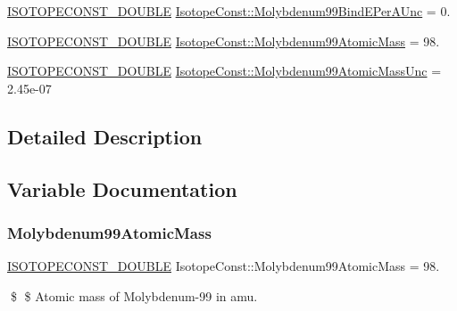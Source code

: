 \begin{DoxyCompactItemize}
\mbox{\hyperlink{group___isotope_const-_macros_ga8f45a7272ce02c0b4c65c44636ed719a}{I\+S\+O\+T\+O\+P\+E\+C\+O\+N\+S\+T\+\_\+\+D\+O\+U\+B\+LE}} \mbox{\hyperlink{group___isotope_const-_molybdenum-_mo99_ga4831990ba352bfbcdbaa43ddada32390}{Isotope\+Const\+::\+Molybdenum99\+Bind\+E\+Per\+A\+Unc}} = 0.
\item 
\mbox{\hyperlink{group___isotope_const-_macros_ga8f45a7272ce02c0b4c65c44636ed719a}{I\+S\+O\+T\+O\+P\+E\+C\+O\+N\+S\+T\+\_\+\+D\+O\+U\+B\+LE}} \mbox{\hyperlink{group___isotope_const-_molybdenum-_mo99_ga9a7b0e6f4be8d4723c1ae490402698f7}{Isotope\+Const\+::\+Molybdenum99\+Atomic\+Mass}} = 98.
\item 
\mbox{\hyperlink{group___isotope_const-_macros_ga8f45a7272ce02c0b4c65c44636ed719a}{I\+S\+O\+T\+O\+P\+E\+C\+O\+N\+S\+T\+\_\+\+D\+O\+U\+B\+LE}} \mbox{\hyperlink{group___isotope_const-_molybdenum-_mo99_ga2edd6e334e8560f4f5884320c753ee5c}{Isotope\+Const\+::\+Molybdenum99\+Atomic\+Mass\+Unc}} = 2.\+45e-\/07
\end{DoxyCompactItemize}


\subsection{Detailed Description}


\subsection{Variable Documentation}
\mbox{\label{group___isotope_const-_molybdenum-_mo99_ga9a7b0e6f4be8d4723c1ae490402698f7}} 
\subsubsection{\texorpdfstring{Molybdenum99\+Atomic\+Mass}{Molybdenum99AtomicMass}}
{\footnotesize\ttfamily \mbox{\hyperlink{group___isotope_const-_macros_ga8f45a7272ce02c0b4c65c44636ed719a}{I\+S\+O\+T\+O\+P\+E\+C\+O\+N\+S\+T\+\_\+\+D\+O\+U\+B\+LE}} Isotope\+Const\+::\+Molybdenum99\+Atomic\+Mass = 98.}

\$ \$ Atomic mass of Molybdenum-\/99 in amu. \mbox{\label{group___isotope_const-_molybdenum-_mo99_ga2edd6e334e8560f4f5884320c753ee5c}} 
